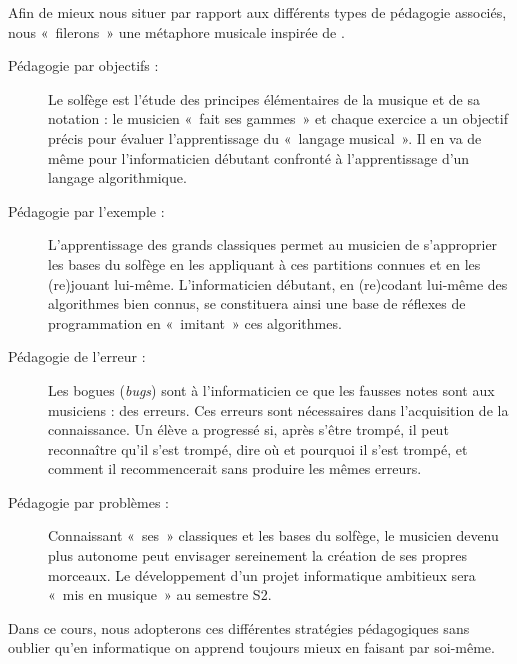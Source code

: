Afin de mieux nous situer par rapport aux différents types de pédagogie
associés, nous «~filerons~» une métaphore musicale inspirée de \cite{charles}.
\begin{description}
\item[Pédagogie par objectifs :] Le solfège est l'étude des principes élémentaires
	de la musique et de sa notation : le musicien «~fait ses gammes~» et chaque exercice
	a un objectif précis pour évaluer l'apprentissage du «~langage musical~».
	Il en va de même pour l'informaticien débutant confronté à l'apprentissage d'un 
	langage algorithmique.
\item[Pédagogie par l'exemple :] L'apprentissage des grands classiques 
	permet au musicien
	de s'approprier les bases du solfège en les appliquant à ces partitions connues et en les
	(re)jouant lui-même. L'informaticien débutant, en (re)codant lui-même des algorithmes bien
	connus, se constituera ainsi une base de réflexes de programmation en «~imitant~» ces
	algorithmes.
\item[Pédagogie de l'erreur :] Les bogues ({\em bugs}) sont à l'informaticien ce que les fausses notes
	sont aux musiciens : des erreurs. 
	Ces erreurs sont nécessaires dans l'acquisition de la connaissance.
	Un élève a progressé si, après s'être trompé,
	il peut reconnaître qu'il s'est trompé,  dire où et pourquoi il s'est trompé,
	et comment il recommencerait sans produire les mêmes erreurs.
\item[Pédagogie par problèmes :] Connaissant «~ses~» classiques et les bases du solfège, le musicien
	devenu plus autonome peut envisager sereinement la création de ses propres morceaux.
	Le développement d'un projet informatique ambitieux sera «~mis en musique~» au semestre S2.
\end{description}

Dans ce cours, nous adopterons ces différentes stratégies pédagogiques sans oublier
qu'en informatique on apprend toujours mieux en faisant par soi-même.

